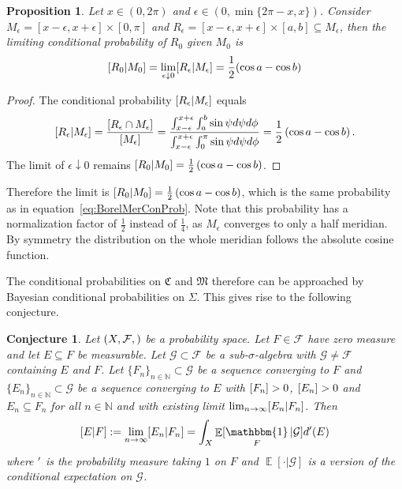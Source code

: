 \documentclass[twoside,a4paper]{report}
\theoremstyle{plain}
\newtheorem{proposition}[theorem]{Proposition}
\newtheorem{conjecture}[theorem]{Conjecture}
\theoremstyle{definition}
\theoremstyle{remark}
\numberwithin{equation}{chapter}
\newcommand{\N}{\mathbb{N}}
\let\P\relax
\DeclareMathOperator{\P}{\mathbb{P}}
\DeclareMathOperator{\E}{\mathbb{E}}
\DeclareMathOperator{\1}{\mathbbm{1}}
\newcommand{\F}{\mathcal{F}}
\renewcommand{\G}{\mathcal{G}}
\begin{document}
\begin{proposition}\label{prop:BorelMerBayes}
Let $x\in(0,2\pi)$ and $\epsilon\in(0,\min\{2\pi-x,x\})$. Consider $M_\epsilon=[x-\epsilon,x+\epsilon]\times[0,\pi]$ and $R_\epsilon=[x-\epsilon,x+\epsilon]\times[a,b]\subseteq M_\epsilon$, then the limiting conditional probability of $R_0$ given $M_0$ is
\begin{equation}
\P[R_0|M_0]=\lim_{\epsilon\downarrow0}\P[R_\epsilon|M_\epsilon]=\frac{1}{2}(\cos a-\cos b)
\end{equation}
\end{proposition}
\begin{proof}
The conditional probability $\P[R_\epsilon|M_\epsilon]$ equals
\begin{equation}
\P[R_\epsilon|M_\epsilon]=\frac{\P[R_\epsilon\cap M_\epsilon]}{\P[M_\epsilon]}=\frac{\int_{x-\epsilon}^{x+\epsilon}\int_a^b\sin\psi d\psi d\phi}{\int_{x-\epsilon}^{x+\epsilon}\int_0^{\pi}\sin\psi d\psi d\phi}=\frac{1}{2}\left(\cos a-\cos b\right).
\end{equation}
The limit of $\epsilon\downarrow0$ remains $\P[R_0|M_0]=\frac{1}{2}\left(\cos a-\cos b\right)$.
\end{proof}

Therefore the limit is $\P[R_0|M_0]=\frac{1}{2}\left(\cos a-\cos b\right)$, which is the same probability as in equation~\ref{eq:BorelMerConProb}. Note that this probability has a normalization factor of $\frac{1}{2}$ instead of $\frac{1}{4}$, as $M_\epsilon$ converges to only a half meridian. By symmetry the distribution on the whole meridian follows the absolute cosine function.

The conditional probabilities on $\mathfrak{C}$ and $\mathfrak{M}$ therefore can be approached by Bayesian conditional probabilities on $\Sigma$. This gives rise to the following conjecture.
\begin{conjecture}\label{con:BorelConjecture}
Let $(X,\F,\P)$ be a probability space. Let $F\in\mathcal{F}$ have zero measure and let $E\subseteq F$ be measurable. Let $\G\subset\F$ be a sub-$\sigma$-algebra with $\G\neq\F$ containing $E$ and $F$. Let $\{F_n\}_{n\in\N}\subset\G$ be a sequence converging to $F$ and $\{E_n\}_{n\in\N}\subset\G$ be a sequence converging to $E$ with $\P[F_n]>0$, $\P[E_n]>0$ and $E_n\subseteq F_n$ for all $n\in\N$ and with existing limit $\lim_{n\to\infty}\P[E_n|F_n]$. Then
\begin{equation}
\P[E|F]:=\lim_{n\to\infty}\P[E_n|F_n]=\int_X\E[\1_F|\mathcal{G}]d\P'(E)
\end{equation}
where $\P'$ is the probability measure taking $1$ on $F$ and $\E[\cdot|\G]$ is a version of the conditional expectation on $\G$.
\end{conjecture}
\end{document}

